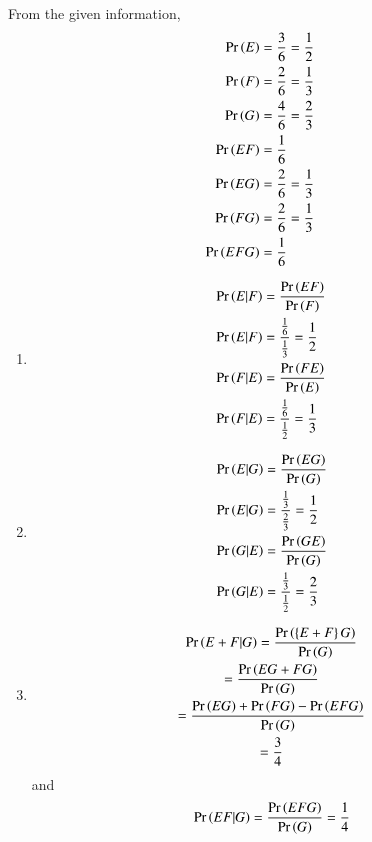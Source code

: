 From the given information,
	\begin{align}
	\Pr\left(E\right) &= \frac{3}{6} = \frac{1}{2} \\
	\Pr\left(F\right) &= \frac{2}{6} = \frac{1}{3} \\	
	\Pr\left(G\right) &= \frac{4}{6} = \frac{2}{3} \\	
	\Pr\left(E F\right) &= \frac{1}{6}\\
	\Pr\left(E G\right) &= \frac{2}{6}= \frac{1}{3}\\
	\Pr\left(F G\right) &= \frac{2}{6}= \frac{1}{3}\\
	\Pr\left(E F G\right) &= \frac{1}{6}
\end{align}
\begin{enumerate}
\item	
\begin{align}
	\Pr\left(E|F\right) &= \frac{\Pr\left(E F\right)}{\Pr\left(F\right)}\\
	\Pr\left(E|F\right) &= \frac{\frac{1}{6}}{\frac{1}{3}} = \frac{1}{2}\\
	\Pr\left(F|E\right) &= \frac{\Pr\left(F E\right)}{\Pr\left(E\right)}\\
	\Pr\left(F|E\right) &= \frac{\frac{1}{6}}{\frac{1}{2}} = \frac{1}{3}
	\end{align}

\item 	\begin{align}
	\Pr\left(E|G\right) &= \frac{\Pr\left(E G\right)}{\Pr\left(G\right)}\\
	\Pr\left(E|G\right) &= \frac{\frac{1}{3}}{\frac{2}{3}} = \frac{1}{2}\\
	\Pr\left(G|E\right) &= \frac{\Pr\left(G E\right)}{\Pr\left(G\right)}\\
	\Pr\left(G|E\right) &= \frac{\frac{1}{3}}{\frac{1}{2}} = \frac{2}{3}\\
	\end{align}
	
\item	%
\begin{multline}
\Pr\left(E+F|G\right) = \frac{\Pr\left(\left\{E+F\right\}G\right)}{\Pr\left(G\right)}
\\
 = \frac{\Pr\left(EG + FG\right)}{\Pr\left(G\right)}
\\
=\frac{\Pr\left(EG\right) +\Pr\left( FG\right)- \Pr\left(EFG\right)}{\Pr\left(G\right)}
\\
 = \frac{3}{4}
\end{multline}
and 
\begin{align}
\Pr\left(EF|G\right) = 
\frac{ \Pr\left(EFG\right)}{\Pr\left(G\right)}
 = \frac{1}{4}
\end{align}

\end{enumerate}
